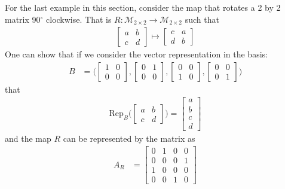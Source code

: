 For the last example in this section, consider the map that rotates a 2 by 2 matrix 90$^{\circ}$ clockwise.  That is $R: \mathcal{M}_{2 \times 2} \rightarrow \mathcal{M}_{2 \times 2}$ such that 
%
\begin{align*}
\begin{bmatrix}
a & b \\
c & d 
\end{bmatrix} \mapsto \begin{bmatrix}
c & a \\ d& b 
\end{bmatrix}
\end{align*}
One can show that if we consider the vector representation in the basis:
%
\begin{align*}
B & = \biggl( \begin{bmatrix}
1 &0 \\ 0 & 0 
\end{bmatrix}, \begin{bmatrix}
0 &1 \\ 0 & 0 
\end{bmatrix}, \begin{bmatrix}
0 &0 \\ 1 & 0 
\end{bmatrix}, \begin{bmatrix}
0 &0 \\ 0 & 1
\end{bmatrix} \biggr) 
\end{align*}
that
%
\begin{align*}
\text{Rep}_B \biggl( \begin{bmatrix}
a & b \\ c & d 
\end{bmatrix} \biggr) = \begin{bmatrix}
a \\ b \\ c \\ d
\end{bmatrix}
\end{align*}
and the map $R$ can be represented by the matrix as
%
\begin{align*}
A_R & = \begin{bmatrix}
0 & 1 & 0 & 0 \\
0 & 0 & 0 & 1 \\
1 & 0 & 0 & 0 \\
0 & 0 & 1 & 0 
\end{bmatrix}
\end{align*}

